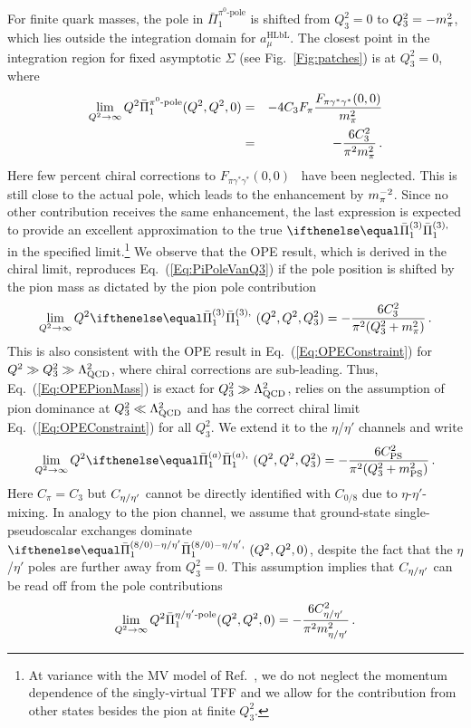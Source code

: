 For finite quark masses, the pole in $\bar{\Pi}_1^\text{$\pi^0$-pole}$ is shifted from $Q_3^2 = 0$ to $Q_3^2 = -m_\pi^2$, which lies outside the integration domain for $a_\mu^{\text{HLbL}}$. The closest point in the integration region for fixed asymptotic $\Sigma$ (see Fig.~\ref{Fig:patches}) is at $Q_3^2 = 0$, where
\begin{eqnarray}
\lim\limits_{Q^2 \to \infty} Q^2 \bar{\Pi}_1^\text{$\pi^0$-pole}(Q^2, Q^2, 0) & = & -4 C_3 F_\pi \frac{F_{\pi\gamma^*\gamma^*}(0, 0)}{m_\pi^2} \nonumber \\ & = & - \frac{6 C_3^2}{\pi^2 m_\pi^2}\, .
\label{Eq:PiPoleVanQ3}
\end{eqnarray}
Here few percent chiral corrections to $F_{\pi\gamma^*\gamma^*}(0, 0)$~\cite{Moussallam:1994xp, Goity:2002nn, Ananthanarayan:2002kj, Ioffe:2007eg, Kampf:2009tk} have been neglected. This is still close to the actual pole, which leads to the enhancement by $m_\pi^{-2}$. Since no other contribution receives the same enhancement, the last expression is expected to provide an excellent approximation to the true $\Pipion$ in the specified limit.\footnote{At variance with the MV model of Ref.~\cite{MV}, we do not neglect the momentum dependence of the singly-virtual TFF and we allow for the contribution from other states besides the pion at finite $Q_3^2$.} We observe that the OPE result, which is derived in the chiral limit, reproduces Eq.~(\ref{Eq:PiPoleVanQ3}) if the pole position is shifted by the pion mass as dictated by the pion pole contribution
\begin{equation}
\lim\limits_{Q^2\to\infty} Q^2 \Pipion(Q^2, Q^2, Q_3^2) = -\frac{6 C_3^2}{\pi^2 (Q_3^2 + \mpi^2)}\, .
\label{Eq:OPEPionMass}
\end{equation}
This is also consistent with the OPE result in Eq.~(\ref{Eq:OPEConstraint}) for $Q^2 \gg Q_3^2 \gg \Lambda_\text{QCD}^2$, where chiral corrections are sub-leading. Thus, Eq.~(\ref{Eq:OPEPionMass}) is exact for $Q_3^2 \gg \Lambda_\text{QCD}^2$, relies on the assumption of pion dominance at $Q_3^2 \ll \Lambda_\text{QCD}^2$ and has the correct chiral limit Eq.~(\ref{Eq:OPEConstraint}) for all $Q_3^2$.  We extend it to the $\eta$/$\eta'$ channels and write
\begin{equation}
\lim\limits_{Q^2\to\infty} Q^2 \PiPS(Q^2, Q^2, Q_3^2) = -\frac{6 C_\text{PS}^2}{\pi^2 (Q_3^2 + m_\text{PS}^2)}\, .
\label{Eq:OPEConstraintMasses}
\end{equation}
Here $C_\pi = C_3$ but $C_{{\eta / \eta'}}$ cannot be directly identified with $C_{0/8}$ due to $\eta$-$\eta'$-mixing. In analogy to the pion channel, we assume that ground-state single-pseudoscalar exchanges dominate $\Pietaetap(Q^2, Q^2, 0)$, despite the fact that the $\eta$/$\eta'$ poles are further away from $Q_3^2 = 0$. This assumption implies that $C_{{\eta / \eta'}}$ can be read off from the pole contributions
\begin{equation}
\lim\limits_{Q^2\to\infty} Q^2\bar{\Pi}_1^{\text{${\eta / \eta'}$-pole}}(Q^2, Q^2, 0) = -\frac{6 C_{{\eta / \eta'}}^2}{\pi^2 m_{{\eta / \eta'}}^2}\,.
\label{Eq:defCetaetap}
\end{equation}

